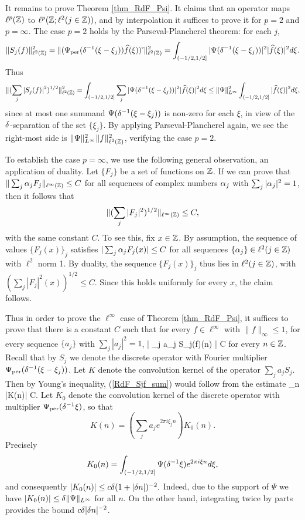 \documentclass[oneside,11pt]{amsart}
\begin{document}
 

It remains to prove 
Theorem  \ref{thm_RdF_Psi}. It claims that an operator maps $\ell^{p}(\mathbb{Z})$ to $\ell^{p}(\mathbb{Z}; \ell^2(j \in \mathbb{Z}))$, and by interpolation it suffices to prove  it for $p=2$ and $p=\infty$.
The case $p=2$ holds by the Parseval-Plancherel theorem: for each $j$,
\[ \| S_j(f) \|_{\ell^2(\mathbb{Z})}^2=\| (\Psi_{\mathrm{per}}(\delta^{-1}(\xi - \xi_j)) \widehat{f}(\xi))\check{\;} \|_{\ell^2(\mathbb{Z})}^2 = \int_{(-1/2,1/2]} | \Psi(\delta^{-1}(\xi - \xi_j))|^2 |\widehat{f}(\xi)|^2 d\xi.\]
Thus 
\[ \| (\sum_j |S_j(f)|^2)^{1/2}\|_{\ell^2(\mathbb{Z})}^2 = \int_{(-1/2,1/2]} \sum_j |\Psi(\delta^{-1}(\xi - \xi_j))|^2 |\widehat{f}(\xi)|^2 d\xi \leq \| \Psi\|_{L^\infty}^2 \int_{(-1/2,1/2]} |\widehat{f}(\xi)|^2 d\xi,\]
since at most one summand $\Psi(\delta^{-1}(\xi - \xi_j))$ is non-zero for each $\xi$, in view of the  $\delta$-separation  of the set $\{\xi_j\}$. 
By applying Parseval-Plancherel again, we see the right-most side is $\| \Psi\|_{L^\infty}^2\|f\|_{\ell^2(\mathbb{Z})}^2$, verifying the case $p=2$.
 


To establish the case $p=\infty$, we use the following general observation, an application of duality. 
Let $\{F_j\}$ be a set of functions on $\mathbb{Z}$. If we can prove that $\| \sum_j \alpha_j F_j \|_{\ell^\infty(\mathbb{Z})} \leq C$ for all sequences of complex numbers $\alpha_j$ with $\sum_j |\alpha_j|^2 = 1$, then it follows that
\[ \| (\sum_j |F_j|^2)^{1/2} \|_{\ell^\infty(\mathbb{Z})}  \leq C,\]
with the same constant $C$.
To see this, 
fix $x \in \mathbb{Z}$. By assumption, the sequence of values $\{F_j(x)\}_j$  satisfies $| \sum_j \alpha_j F_j(x) | \leq C$ for all sequences $\{\alpha_j\} \in \ell^2(j \in \mathbb{Z})$ with $\ell^2$ norm 1. By duality, the sequence $\{ F_j(x)\}_j$ thus lies in $\ell^2(j \in \mathbb{Z})$, with $ (\sum_j |F_j|^2(x))^{1/2} \leq C$. Since this holds uniformly for every $x$, the claim follows.
 
Thus in order to prove the $\ell^\infty$ case of Theorem \ref{thm_RdF_Psi}, it suffices to prove that there is a constant $C$ such that for every $f \in \ell^\infty$ with $\|f\|_{\infty} \leq 1$, for every sequence $\{a_j\}$ with $\sum_j |a_j|^2 = 1$,  
\beq\label{RdF_Sjf_sum}
| \sum_j a_j S_j(f)(n) | \leq C
\eeq
for every $n \in \mathbb{Z}$. Recall that by $S_j$ we denote the discrete operator with Fourier multiplier $\Psi_{\mathrm{per}}(\delta^{-1}(\xi - \xi_j))$. Let $K$ denote the convolution kernel of the operator $\sum_j a_j S_j$. Then by Young's inequality, (\ref{RdF_Sjf_sum})   would follow from the estimate 
\beq\label{RdF_K_est}
\sum_{n \in \Z} |K(n)| \leq C.
\eeq
Let $K_0$ denote the convolution kernel of the discrete operator with multiplier $\Psi_{\mathrm{per}}(\delta^{-1}\xi)$, so that
\[
 K(n)  =  ( \sum_j a_je^{2\pi i \xi_j n}) K_0(n).
\]
Precisely
\[ K_0(n) = \int_{(-1/2,1/2]} \Psi (\delta^{-1}\xi) e^{2\pi i \xi n} d\xi,
\]
and consequently
$ |K_0(n)| \leq c \delta (1+|\delta n|)^{-2}.
$
 Indeed, due to the support of $\Psi$ we   have $|K_0(n)| \leq \delta \|\Psi \|_{L^\infty}$ for all $n$. On the other hand, integrating twice by parts provides the bound $c\delta |\delta n|^{-2}$.
\end{document}
